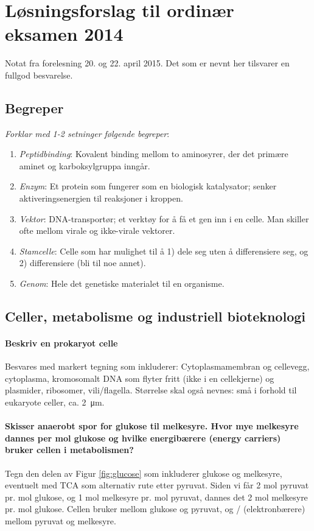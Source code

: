 \section{Løsningsforslag til ordinær eksamen 2014}

Notat fra forelesning 20. og 22. april 2015. Det som er nevnt her tilsvarer en fullgod besvarelse.

\newcommand{\e}{\emph}

\subsection{Begreper}
\e{Forklar med 1-2 setninger følgende begreper}:
\begin{enumerate}
	\item \e{Peptidbinding}: Kovalent binding mellom to aminosyrer, der det primære aminet og karboksylgruppa inngår.
	\item \e{Enzym}: Et protein som fungerer som en biologisk katalysator; senker aktiveringsenergien til reaksjoner i kroppen.
	\item \e{Vektor}: DNA-transportør; et verktøy for å få et gen inn i en celle. Man skiller ofte mellom virale og ikke-virale vektorer.
	\item \e{Stamcelle}: Celle som har mulighet til å 1) dele seg uten å differensiere seg, og 2) differensiere (bli til noe annet). 
	\item\e{Genom}: Hele det genetiske materialet til en organisme.
\end{enumerate}

\subsection{Celler, metabolisme og industriell bioteknologi}

\paragraph{Beskriv en prokaryot celle} Besvares med markert tegning som inkluderer: Cytoplasmamembran og cellevegg, cytoplasma, kromosomalt DNA som flyter fritt (ikke i en cellekjerne) og plasmider, ribosomer, vili/flagella. Størrelse skal også nevnes: små i forhold til eukaryote celler, ca. \SI{2}{\micro\meter}.

\paragraph{Skisser anaerobt spor for glukose til melkesyre. Hvor mye melkesyre dannes per mol glukose og hvilke energibærere (energy carriers) bruker cellen i metabolismen?} Tegn den delen av Figur \ref{fig:glucose} som inkluderer glukose og melkesyre, eventuelt med TCA som alternativ rute etter pyruvat. Siden vi får 2 mol pyruvat pr. mol glukose, og 1 mol melkesyre pr. mol pyruvat, dannes det 2 mol melkesyre pr. mol glukose. Cellen bruker  mellom glukose og pyruvat, og / (elektronbærere) mellom pyruvat og melkesyre.

